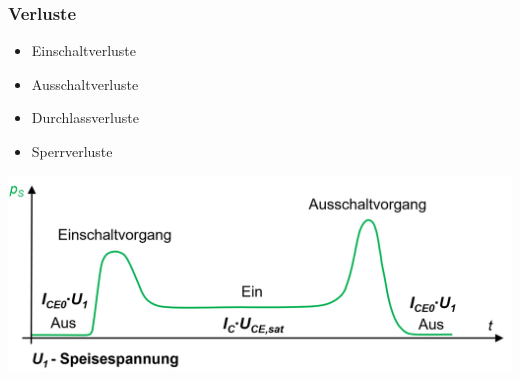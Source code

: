 \begin{minipage}{0.5\linewidth}
    \subsubsection{Verluste}
    \begin{itemize}
        \item Einschaltverluste
        \item Ausschaltverluste
        \item Durchlassverluste
        \item Sperrverluste
    \end{itemize}
\end{minipage}
\begin{minipage}{0.5\linewidth}
    \hspace{0.5cm}\includegraphics[width=\linewidth]{images/npnTransVerluste}
\end{minipage}
\clearpage

\vspace*{-1cm}
